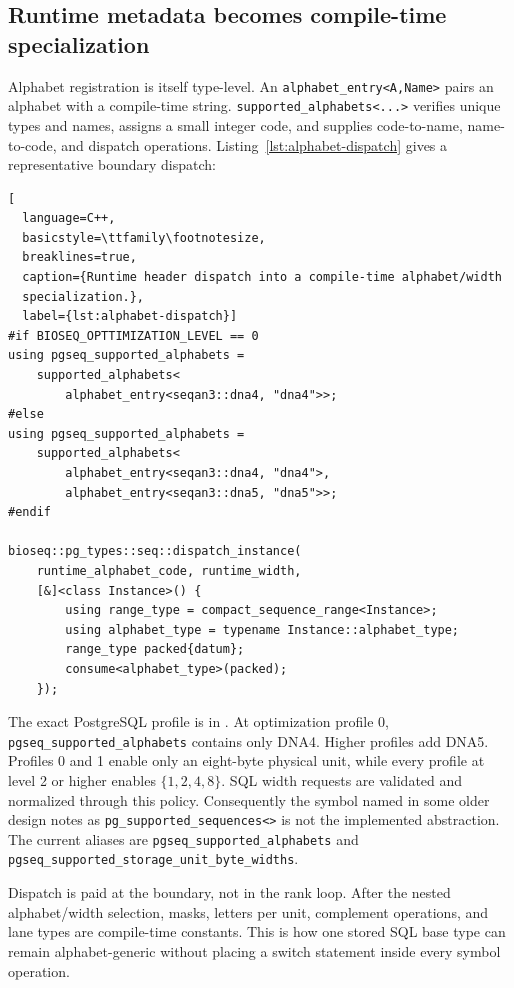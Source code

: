 \subsection{Runtime metadata becomes compile-time specialization}

Alphabet registration is itself type-level.  An
\texttt{alphabet\_entry<A,Name>} pairs an alphabet with a compile-time string.
\texttt{supported\_alphabets<...>} verifies unique types and names, assigns a
small integer code, and supplies code-to-name, name-to-code, and dispatch
operations.  Listing~\ref{lst:alphabet-dispatch} gives a representative
boundary dispatch:

\begin{lstlisting}[
  language=C++,
  basicstyle=\ttfamily\footnotesize,
  breaklines=true,
  caption={Runtime header dispatch into a compile-time alphabet/width
  specialization.},
  label={lst:alphabet-dispatch}]
#if BIOSEQ_OPTTIMIZATION_LEVEL == 0
using pgseq_supported_alphabets =
    supported_alphabets<
        alphabet_entry<seqan3::dna4, "dna4">>;
#else
using pgseq_supported_alphabets =
    supported_alphabets<
        alphabet_entry<seqan3::dna4, "dna4">,
        alphabet_entry<seqan3::dna5, "dna5">>;
#endif

bioseq::pg_types::seq::dispatch_instance(
    runtime_alphabet_code, runtime_width,
    [&]<class Instance>() {
        using range_type = compact_sequence_range<Instance>;
        using alphabet_type = typename Instance::alphabet_type;
        range_type packed{datum};
        consume<alphabet_type>(packed);
    });
\end{lstlisting}

The exact PostgreSQL profile is in
.
At optimization profile 0, \texttt{pgseq\_supported\_alphabets} contains only
DNA4.  Higher profiles add DNA5.  Profiles 0 and 1 enable only an eight-byte
physical unit, while every profile at level 2 or higher enables
\(\{1,2,4,8\}\).  SQL width requests
are validated and normalized through this policy.  Consequently the symbol
named in some older design notes as \texttt{pg\_supported\_sequences<>} is not
the implemented abstraction.  The current aliases are
\texttt{pgseq\_supported\_alphabets} and
\texttt{pgseq\_supported\_storage\_unit\_byte\_widths}.

Dispatch is paid at the boundary, not in the rank loop.  After the nested
alphabet/width selection, masks, letters per unit, complement operations, and
lane types are compile-time constants.  This is how one stored SQL base type
can remain alphabet-generic without placing a switch statement inside every
symbol operation.

